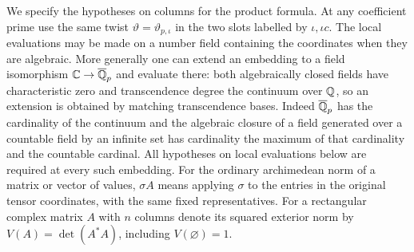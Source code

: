 \documentclass[a4paper,11pt]{article}
\theoremstyle{definition}
\theoremstyle{remark}
\numberwithin{equation}{section}
\begin{document}
We specify the hypotheses on columns for the product formula.
At any coefficient prime use the same twist
\(\vartheta=\vartheta_{p,\iota}\) in the two slots labelled by
\(\iota,\iota c\). The local evaluations may be made on a
number field containing the coordinates when they are algebraic.
More generally one can extend an embedding to a field
isomorphism \(\mathbb C\to\overline{\mathbb Q}_p\) and evaluate there:
both algebraically closed fields have characteristic zero and
transcendence degree the continuum over \(\mathbb Q\), so an extension
is obtained by matching transcendence bases. Indeed
\(\overline{\mathbb Q}_p\) has the cardinality of the continuum and
the algebraic closure of a field generated over a countable
field by an infinite set has cardinality the maximum of that
cardinality and the countable cardinal. All hypotheses on
local evaluations below are required at every such embedding.
For the ordinary archimedean norm of a matrix or vector of
values, \(\sigma A\) means applying \(\sigma\) to the entries
in the original tensor coordinates, with the same fixed
representatives. For a rectangular complex matrix \(A\) with
\(n\) columns denote its squared exterior norm by
\(V(A)=\det(A^*A)\), including \(V(\varnothing)=1\).
\end{document}
